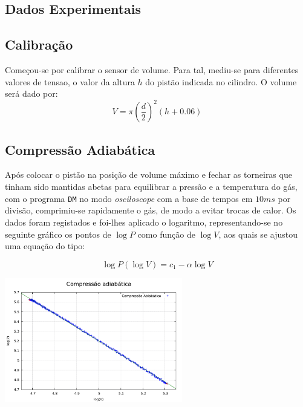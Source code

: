 \documentclass[9pt]{extarticle}
\newcommand{\PC}[1]{\ensuremath{\left(#1\right)}}
\begin{document}
\begin{multicols}{2}
\section{Dados Experimentais}

\subsection*{Calibração}

\par Começou-se por calibrar o sensor de volume. Para tal, mediu-se para diferentes valores de tensao, o valor da altura $h$ do pistão indicada no cilindro. O volume será dado por:
\begin{equation}
V = \pi\PC{\frac{d}{2}}^2\PC{h+0.06}
\end{equation}
\begin{center}
\par{}
\end{center}

\subsection*{Compressão Adiabática}

\par Após colocar o pistão na posição de volume máximo e fechar as torneiras que tinham sido mantidas abetas para equilibrar a pressão e a temperatura do gás, com o programa \verb|DM| no modo {\it osciloscope} com a base de tempos em $10ms$ por divisão, comprimiu-se rapidamente o gás, de modo a evitar trocas de calor. Os dados foram registados e foi-lhes aplicado o logaritmo, representando-se no seguinte gráfico os pontos de $\log{P}$ como função de $\log{V}$, aos quais se ajustou uma equação do tipo:

\begin{equation} \label{LADB1}
\log{P}\PC{\log{V}}=c_1-\alpha\log{V}
\end{equation}

\includegraphics[width=220pt]{LADB1.pdf}
\begin{center}
\par{}
\end{center}


\end{multicols}
\end{document}
